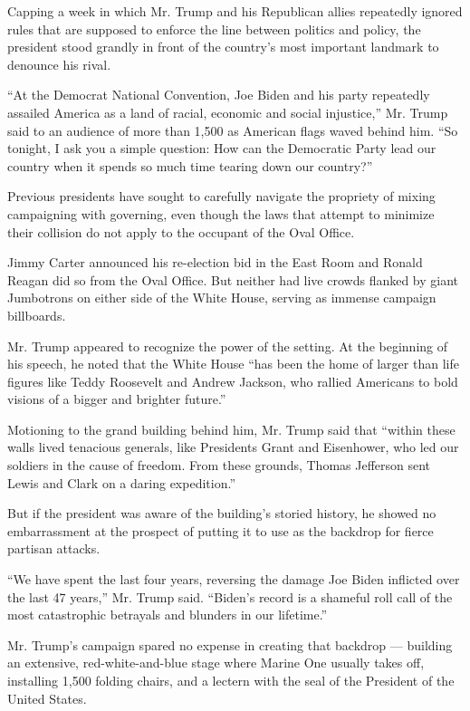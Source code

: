 Capping a week in which Mr. Trump and his Republican allies repeatedly
ignored rules that are supposed to enforce the line between politics and
policy, the president stood grandly in front of the country's most
important landmark to denounce his rival.

``At the Democrat National Convention, Joe Biden and his party
repeatedly assailed America as a land of racial, economic and social
injustice,'' Mr. Trump said to an audience of more than 1,500 as
American flags waved behind him. ``So tonight, I ask you a simple
question: How can the Democratic Party lead our country when it spends
so much time tearing down our country?''

Previous presidents have sought to carefully navigate the propriety of
mixing campaigning with governing, even though the laws that attempt to
minimize their collision do not apply to the occupant of the Oval
Office.

Jimmy Carter announced his re-election bid in the East Room and Ronald
Reagan did so from the Oval Office. But neither had live crowds flanked
by giant Jumbotrons on either side of the White House, serving as
immense campaign billboards.

Mr. Trump appeared to recognize the power of the setting. At the
beginning of his speech, he noted that the White House ``has been the
home of larger than life figures like Teddy Roosevelt and Andrew
Jackson, who rallied Americans to bold visions of a bigger and brighter
future.''

Motioning to the grand building behind him, Mr. Trump said that ``within
these walls lived tenacious generals, like Presidents Grant and
Eisenhower, who led our soldiers in the cause of freedom. From these
grounds, Thomas Jefferson sent Lewis and Clark on a daring expedition.''

But if the president was aware of the building's storied history, he
showed no embarrassment at the prospect of putting it to use as the
backdrop for fierce partisan attacks.

``We have spent the last four years, reversing the damage Joe Biden
inflicted over the last 47 years,'' Mr. Trump said. ``Biden's record is
a shameful roll call of the most catastrophic betrayals and blunders in
our lifetime.''

Mr. Trump's campaign spared no expense in creating that backdrop ---
building an extensive, red-white-and-blue stage where Marine One usually
takes off, installing 1,500 folding chairs, and a lectern with the seal
of the President of the United States.

